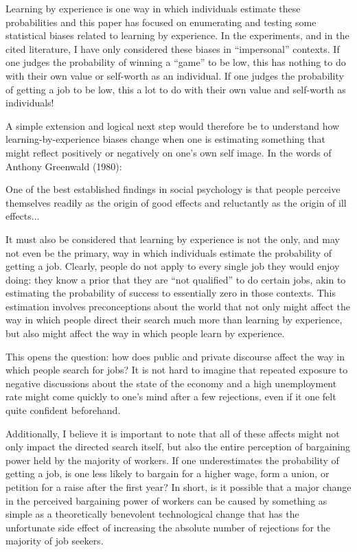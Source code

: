 \documentclass[a4paper,12pt]{article}
\begin{document}
Learning by experience is one way in which individuals estimate these probabilities and this paper has focused on enumerating and testing some statistical biases related to learning by experience. In the experiments, and in the cited literature, I have only considered these biases in ``impersonal'' contexts. If one judges the probability of winning a ``game'' to be low, this has nothing to do with their own value or self-worth as an individual. If one judges the probability of getting a job to be low, this a lot to do with their own value and self-worth as individuals!

A simple extension and logical next step would therefore be to understand how learning-by-experience biases change when one is estimating something that might reflect positively or negatively on one's own self image. In the words of Anthony Greenwald (1980):

\begin{displayquote}
One of the best established findings in social psychology is that people perceive themselves readily as the origin of good effects and reluctantly as the origin of ill effects...
\end{displayquote}

It must also be considered that learning by experience is not the only, and may not even be the primary, way in which individuals estimate the probability of getting a job. Clearly, people do not apply to every single job they would enjoy doing: they know a prior that they are ``not qualified'' to do certain jobs, akin to estimating the probability of success to essentially zero in those contexts. This estimation involves preconceptions about the world that not only might affect the way in which people direct their search much more than learning by experience, but also might affect the way in which people learn by experience.

This opens the question: how does public and private discourse affect the way in which people search for jobs? It is not hard to imagine that repeated exposure to negative discussions about the state of the economy and a high unemployment rate might come quickly to one's mind after a few rejections, even if it one felt quite confident beforehand.

Additionally, I believe it is important to note that all of these affects might not only impact the directed search itself, but also the entire perception of bargaining power held by the majority of workers. If one underestimates the probability of getting a job, is one less likely to bargain for a higher wage, form a union, or petition for a raise after the first year? In short, is it possible that a major change in the perceived bargaining power of workers can be caused by something as simple as a theoretically benevolent technological change that has the unfortunate side effect of increasing the absolute number of rejections for the majority of job seekers.
\end{document}
